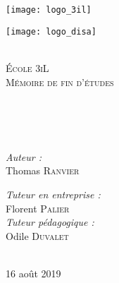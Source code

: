 \begin{titlepage}

\begin{center}

\begin{minipage}{0.5\textwidth}
\begin{flushleft}
\texttt{[image: logo\_3il]}
\end{flushleft}
\end{minipage}
\begin{minipage}{0.49\textwidth}
\begin{flushright}
\texttt{[image: logo\_disa]}
\end{flushright}
\end{minipage}
~\\[1.5cm]

\textsc{\LARGE École 3iL}\\[1.5cm]

\textsc{\huge Mémoire de fin d'études}\\[1.5cm]

\HRule \\[0.4cm]

{\textbf{\huge\textsc{\color{col_title}\sujet} \\[0.4cm]}}

\HRule \\[1.5cm]

\begin{minipage}{0.4\textwidth}
\begin{flushleft} \large
\emph{Auteur :}\\
Thomas \textsc{Ranvier}\\
\end{flushleft}
\end{minipage}
\begin{minipage}{0.4\textwidth}
\begin{flushright} \large
\emph{Tuteur en entreprise :} \\
Florent \textsc{Palier}\\
\emph{Tuteur pédagogique :} \\
Odile \textsc{Duvalet}
\end{flushright}
\end{minipage}

~\\[2.5cm]

{\large 16 août 2019}

\end{center}
\end{titlepage}